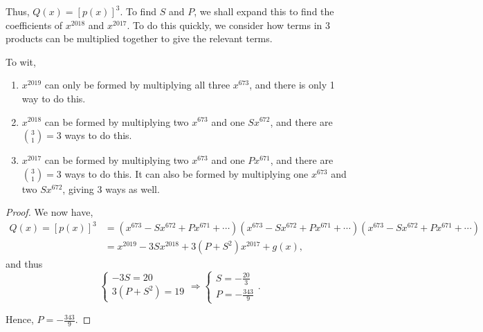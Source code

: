 \documentclass[../main.tex]{subfiles}
\begin{document}
Thus, $Q(x)=[p(x)]^3$. To find $S$ and $P$, we shall expand this to find the coefficients of $x^{2018}$ and $x^{2017}$. To do this quickly, we consider how terms in 3 products can be multiplied together to give the relevant terms.

To wit, 
\begin{enumerate}
    \item $x^{2019}$ can only be formed by multiplying all three $x^{673}$, and there is only 1 way to do this.
    \item $x^{2018}$ can be formed by multiplying two $x^{673}$ and one $Sx^{672}$, and there are $\binom{3}{1}=3$ ways to do this.
    \item $x^{2017}$ can be formed by multiplying two $x^{673}$ and one $Px^{671}$, and there are $\binom{3}{1}=3$ ways to do this. It can also be formed by multiplying one $x^{673}$ and two $Sx^{672}$, giving $3$ ways as well.
\end{enumerate}
\begin{proof}
    We now have,
\begin{align*}
    Q(x)=[p(x)]^3&=(x^{673}-Sx^{672}+Px^{671}+\cdots)(x^{673}-Sx^{672}+Px^{671}+\cdots)(x^{673}-Sx^{672}+Px^{671}+\cdots) \\
    &= x^{2019}-3Sx^{2018}+3(P+S^2)x^{2017}+g(x),
\end{align*}
and thus
$$\begin{cases} -3S=20 \\ 3(P+S^2)=19 \end{cases}\Rightarrow \begin{cases} S=-\frac{20}{3} \\ P=-\frac{343}{9}\end{cases}.$$

Hence, $\boxed{P=-\frac{343}{9}}$.
\end{proof}
\end{document}
